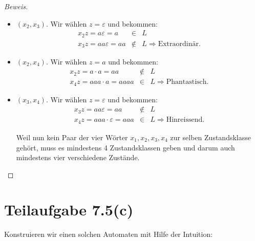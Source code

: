 \documentclass[11pt]{article} %
\theoremstyle{definition}
\begin{document}
\begin{proof}[Beweis]
\begin{itemize}
\item $(x_2, x_3)$. Wir wählen $z = \varepsilon$ und bekommen:
\begin{eqnarray*}
x_2z = a\varepsilon = a &\in& L \\
x_3z = aa\varepsilon = aa &\notin& L \Rightarrow \textrm{Extraordinär.} 
\end{eqnarray*}

\item $(x_2, x_4)$. Wir wählen $z =a$ und bekommen:
\begin{eqnarray*}
x_2z = a\cdot a = aa &\notin& L \\
x_4z = aaa\cdot a = aaaa &\in& L \Rightarrow \textrm{Phantastisch.} 
\end{eqnarray*}

\item $(x_3, x_4)$. Wir wählen $z =\varepsilon$ und bekommen:
\begin{eqnarray*}
x_3z = aa\varepsilon = aa &\notin& L \\
x_4z = aaa\cdot \varepsilon = aaa &\in& L \Rightarrow \textrm{Hinreissend.}
\end{eqnarray*}

Weil nun kein Paar der vier Wörter $x_1, x_2, x_3, x_4$ zur selben Zustandsklasse gehört, muss es mindestens 4 Zustandsklassen geben und darum auch mindestens vier verschiedene Zustände.

\end{itemize}
\end{proof}

\section*{Teilaufgabe 7.5(c)}

Konstruieren wir einen solchen Automaten mit Hilfe der Intuition:
\end{document}
